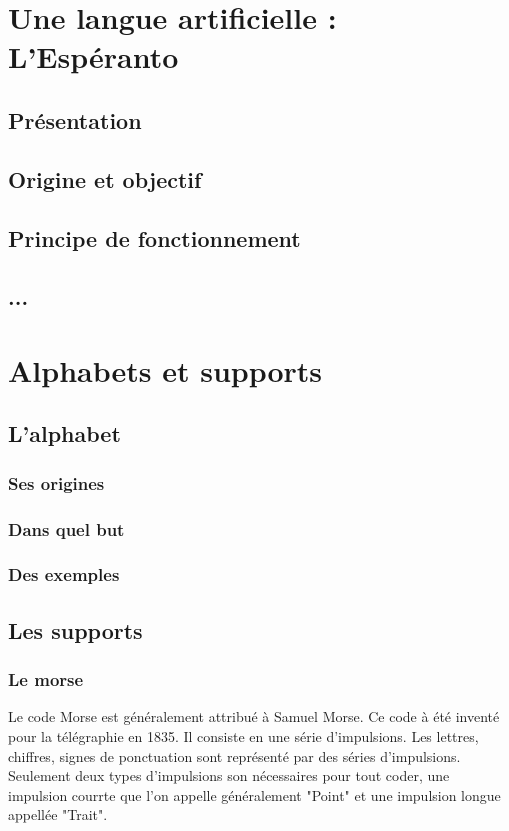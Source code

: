 \documentclass[french,a4paper]{article}
\begin{document}
\section{Une langue artificielle : L'Espéranto}
\subsection{Présentation}
\subsection{Origine et objectif}
\subsection{Principe de fonctionnement}
\subsection{...}

\section{Alphabets et supports}
\subsection{L'alphabet}
\subsubsection{Ses origines}
\subsubsection{Dans quel but}
\subsubsection{Des exemples}

\subsection{Les supports}
\subsubsection{Le morse}
Le code Morse est généralement attribué à Samuel Morse. Ce code à été inventé pour la télégraphie en 1835.
Il consiste en une série d'impulsions. Les lettres, chiffres, signes de ponctuation sont représenté par des séries d'impulsions.
Seulement deux types d'impulsions son nécessaires pour tout coder, une impulsion courrte que l'on appelle généralement
"Point" et une impulsion longue appellée "Trait".
\end{document}
